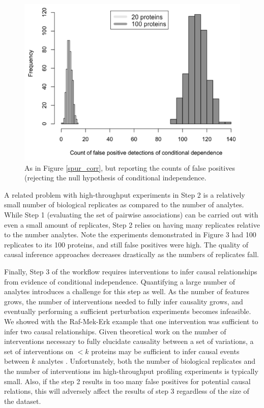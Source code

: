 \documentclass[journal=jacsat,manuscript=article]{achemso}
\def\added#1{{\color{blue} #1}}
\begin{document}
\begin{figure}[!tpb]
\centerline{\includegraphics[width=1\textwidth]{figs/spurious_dep.png}}
\caption{As in Figure \ref{spur_corr}, but reporting the counts of false positives (rejecting the null hypothesis of conditional independence.}
\label{spur_dep}
\end{figure}

A related problem with high-throughput experiments in Step 2 is a relatively small number of biological replicates as compared to the number of analytes. While Step 1 (evaluating the set of pairwise associations) can be carried out with even a small amount of replicates, Step 2 relies on having many replicates relative to the number analytes.  Note the experiments demonstrated in Figure 3 had 100 replicates to its 100 proteins, and still false positives were high.  The quality of causal inference approaches decreases drastically as the numbers of replicates fall.    

Finally, Step 3 of the workflow requires interventions to infer causal relationships from evidence of conditional independence.  Quantifying a large number of analytes introduces a  challenge for this step as well. As the number of features grows, the number of interventions needed to fully infer causality grows, and eventually performing a sufficient perturbation experiments becomes infeasible.   We showed with the Raf-Mek-Erk example that one intervention was sufficient to infer two causal relationships. \added{Given theoretical work on the number of interventions necessary to fully elucidate causality between a set of variations\cite{eberhardt2012number}\cite{hauser2012two}\cite{hyttinen2013experiment}}, a set of interventions on $< k$ proteins may be sufficient to infer causal events between $k$ analytes . Unfortunately, both the number of biological replicates and the number of interventions im high-throughput profiling experiments is typically small.  Also, if the step 2 results in too many false positives for potential causal relations, this will adversely affect the results of step 3 regardless of the size of the dataset.
\end{document}

